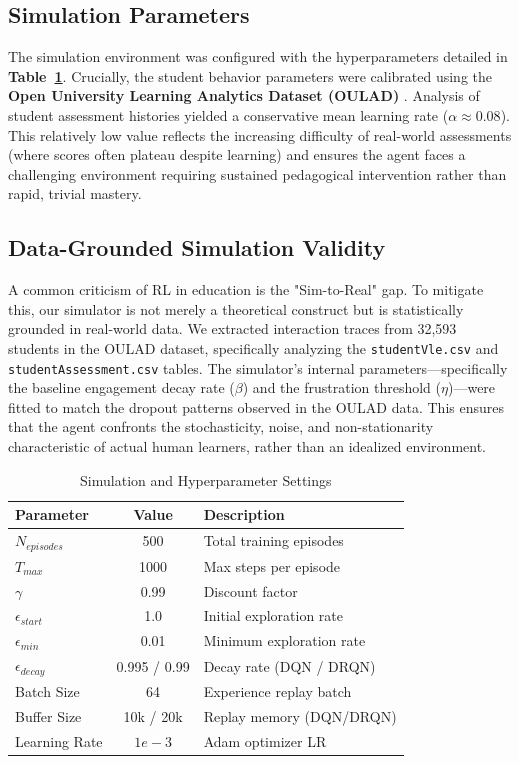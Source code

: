 \documentclass[conference]{IEEEtran}
\begin{document}
\subsection{Simulation Parameters}
The simulation environment was configured with the hyperparameters detailed in \textbf{Table~\ref{tab2}}. Crucially, the student behavior parameters were calibrated using the \textbf{Open University Learning Analytics Dataset (OULAD)} \cite{kuzilek2017}. Analysis of student assessment histories yielded a conservative mean learning rate ($\alpha \approx 0.08$). This relatively low value reflects the increasing difficulty of real-world assessments (where scores often plateau despite learning) and ensures the agent faces a challenging environment requiring sustained pedagogical intervention rather than rapid, trivial mastery.

\subsection{Data-Grounded Simulation Validity}
A common criticism of RL in education is the "Sim-to-Real" gap. To mitigate this, our simulator is not merely a theoretical construct but is statistically grounded in real-world data. We extracted interaction traces from 32,593 students in the OULAD dataset, specifically analyzing the \texttt{studentVle.csv} and \texttt{studentAssessment.csv} tables. The simulator's internal parameters—specifically the baseline engagement decay rate ($\beta$) and the frustration threshold ($\eta$)—were fitted to match the dropout patterns observed in the OULAD data. This ensures that the agent confronts the stochasticity, noise, and non-stationarity characteristic of actual human learners, rather than an idealized environment.

\begin{table}[htbp]
\caption{Simulation and Hyperparameter Settings}
\begin{center}
\begin{tabular}{|l|c|l|}
\hline
\textbf{Parameter} & \textbf{Value} & \textbf{Description} \\
\hline
$N_{episodes}$ & 500 & Total training episodes \\
$T_{max}$ & 1000 & Max steps per episode \\
$\gamma$ & 0.99 & Discount factor \\
$\epsilon_{start}$ & 1.0 & Initial exploration rate \\
$\epsilon_{min}$ & 0.01 & Minimum exploration rate \\
$\epsilon_{decay}$ & 0.995 / 0.99 & Decay rate (DQN / DRQN) \\
Batch Size & 64 & Experience replay batch \\
Buffer Size & 10k / 20k & Replay memory (DQN/DRQN) \\
Learning Rate & $1e-3$ & Adam optimizer LR \\
\hline
\end{tabular}
\label{tab2}
\end{center}
\end{table}
\end{document}
